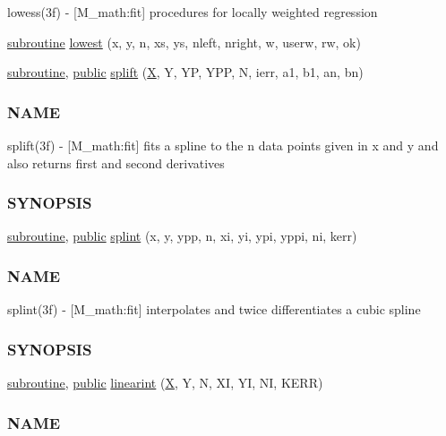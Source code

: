 \begin{DoxyCompactItemize}
\begin{DoxyCompactList}
lowess(3f) -\/ \mbox{[}M\+\_\+math\+:fit\mbox{]} procedures for locally weighted regression \end{DoxyCompactList}\item 
\hyperlink{M__stopwatch_83_8txt_acfbcff50169d691ff02d4a123ed70482}{subroutine} \hyperlink{namespacem__math_a06b587e00199906f1f87f1a7b101d71f}{lowest} (x, y, n, xs, ys, nleft, nright, w, userw, rw, ok)
\item 
\hyperlink{M__stopwatch_83_8txt_acfbcff50169d691ff02d4a123ed70482}{subroutine}, \hyperlink{M__stopwatch_83_8txt_a2f74811300c361e53b430611a7d1769f}{public} \hyperlink{namespacem__math_a94f09a43f1a68e7971e12ace802dfcc0}{splift} (\hyperlink{intro__blas1_83_8txt_ac8596739bc875e90fe6e2ecf98e87906}{X}, Y, YP, Y\+PP, N, ierr, a1, b1, an, bn)
\begin{DoxyCompactList}\small\item\em \subsubsection*{N\+A\+ME}

splift(3f) -\/ \mbox{[}M\+\_\+math\+:fit\mbox{]} fits a spline to the n data points given in x and y and also returns first and second derivatives \subsubsection*{S\+Y\+N\+O\+P\+S\+IS}\end{DoxyCompactList}\item 
\hyperlink{M__stopwatch_83_8txt_acfbcff50169d691ff02d4a123ed70482}{subroutine}, \hyperlink{M__stopwatch_83_8txt_a2f74811300c361e53b430611a7d1769f}{public} \hyperlink{namespacem__math_afb412a273368e2814058a8fc4197ba1a}{splint} (x, y, ypp, n, xi, yi, ypi, yppi, ni, kerr)
\begin{DoxyCompactList}\small\item\em \subsubsection*{N\+A\+ME}

splint(3f) -\/ \mbox{[}M\+\_\+math\+:fit\mbox{]} interpolates and twice differentiates a cubic spline \subsubsection*{S\+Y\+N\+O\+P\+S\+IS}\end{DoxyCompactList}\item 
\hyperlink{M__stopwatch_83_8txt_acfbcff50169d691ff02d4a123ed70482}{subroutine}, \hyperlink{M__stopwatch_83_8txt_a2f74811300c361e53b430611a7d1769f}{public} \hyperlink{namespacem__math_a506d6c6d2e4da1fa5efb731608531c75}{linearint} (\hyperlink{intro__blas1_83_8txt_ac8596739bc875e90fe6e2ecf98e87906}{X}, Y, N, XI, YI, NI, K\+E\+RR)
\begin{DoxyCompactList}\small\item\em \subsubsection*{N\+A\+ME}


\end{DoxyCompactList}
\end{DoxyCompactItemize}
